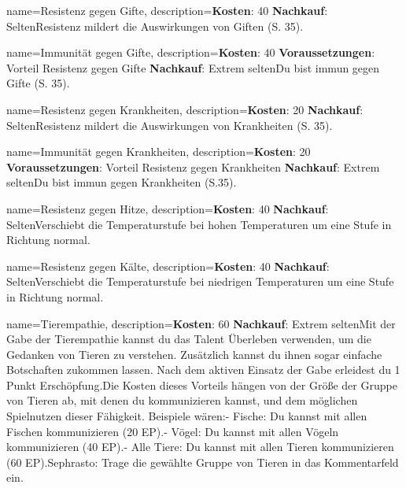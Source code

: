 {
    name={Resistenz gegen Gifte},
    description={\textbf{Kosten}: 40 \textbf{Nachkauf}: Selten\newline Resistenz mildert die Auswirkungen von Giften (S. 35).}
}


{
    name={Immunität gegen Gifte},
    description={\textbf{Kosten}: 40 \textbf{Voraussetzungen}: Vorteil Resistenz gegen Gifte \textbf{Nachkauf}: Extrem selten\newline Du bist immun gegen Gifte (S. 35).}
}


{
    name={Resistenz gegen Krankheiten},
    description={\textbf{Kosten}: 20 \textbf{Nachkauf}: Selten\newline Resistenz mildert die Auswirkungen von Krankheiten (S. 35).}
}


{
    name={Immunität gegen Krankheiten},
    description={\textbf{Kosten}: 20 \textbf{Voraussetzungen}: Vorteil Resistenz gegen Krankheiten \textbf{Nachkauf}: Extrem selten\newline Du bist immun gegen Krankheiten (S.35).}
}


{
    name={Resistenz gegen Hitze},
    description={\textbf{Kosten}: 40 \textbf{Nachkauf}: Selten\newline Verschiebt die Temperaturstufe bei hohen Temperaturen um eine Stufe in Richtung normal.}
}


{
    name={Resistenz gegen Kälte},
    description={\textbf{Kosten}: 40 \textbf{Nachkauf}: Selten\newline Verschiebt die Temperaturstufe bei niedrigen Temperaturen um eine Stufe in Richtung normal.}
}


{
    name={Tierempathie},
    description={\textbf{Kosten}: 60 \textbf{Nachkauf}: Extrem selten\newline Mit der Gabe der Tierempathie kannst du das Talent Überleben verwenden, um die Gedanken von Tieren zu verstehen. Zusätzlich kannst du ihnen sogar einfache Botschaften zukommen lassen. Nach dem aktiven Einsatz der Gabe erleidest du 1 Punkt Erschöpfung.\newline Die Kosten dieses Vorteils hängen von der Größe der Gruppe von Tieren ab, mit denen du kommunizieren kannst, und dem möglichen Spielnutzen dieser Fähigkeit. Beispiele wären:\newline - Fische: Du kannst mit allen Fischen kommunizieren (20 EP).\newline - Vögel: Du kannst mit allen Vögeln kommunizieren (40 EP).\newline - Alle Tiere: Du kannst mit allen Tieren kommunizieren (60 EP).\newline Sephrasto: Trage die gewählte Gruppe von Tieren in das Kommentarfeld ein.}
}


